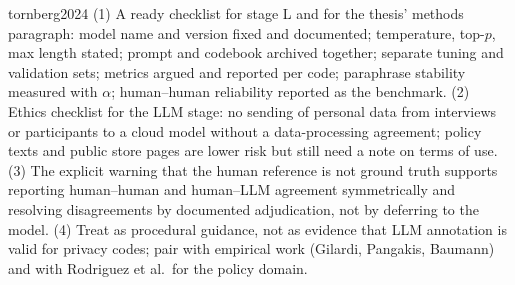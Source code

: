 \begin{papercard}{tornberg2024}
 (1) A ready checklist for stage L and for the thesis' methods paragraph: model name and version fixed and documented; temperature, top-$p$, max length stated; prompt and codebook archived together; separate tuning and validation sets; metrics argued and reported per code; paraphrase stability measured with $\alpha$; human--human reliability reported as the benchmark. (2) Ethics checklist for the LLM stage: no sending of personal data from interviews or participants to a cloud model without a data-processing agreement; policy texts and public store pages are lower risk but still need a note on terms of use. (3) The explicit warning that the human reference is not ground truth supports reporting human--human and human--LLM agreement symmetrically and resolving disagreements by documented adjudication, not by deferring to the model. (4) Treat as procedural guidance, not as evidence that LLM annotation is valid for privacy codes; pair with empirical work (Gilardi, Pangakis, Baumann) and with Rodriguez et al.\ for the policy domain.
\end{papercard}
